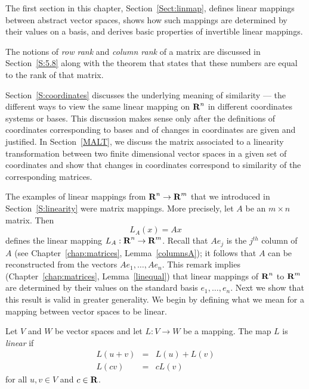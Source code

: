 \label{C:LMCC}

\normalsize

The first section in this chapter, Section~\ref{Sect:linmap}, defines linear 
mappings between abstract vector spaces, shows how such mappings are
determined by their values on a basis, and derives basic properties of 
invertible linear mappings. 
  
The notions of {\em row rank\/} and {\em column rank\/} of a matrix are
discussed in Section~\ref{S:5.8} along with the theorem that states that
these numbers are equal to the rank of that matrix.

Section~\ref{S:coordinates} discusses the underlying meaning of similarity 
--- the different ways to view the same linear mapping on $\mbox{$\bf{R}$}^n$ in different 
coordinates systems or bases.  This discussion makes sense only after the 
definitions of coordinates corresponding to bases and of changes in 
coordinates are given and justified.  In Section~\ref{MALT}, we discuss the 
matrix associated to a linearity transformation between two finite
dimensional vector spaces in a given set of coordinates and show that changes 
in coordinates correspond to similarity of the corresponding matrices.



  \label{Sect:linmap}

The examples of linear mappings
 from $\mbox{$\bf{R}$}^n\to\mbox{$\bf{R}$}^m$ that we introduced in
Section~\ref{S:linearity} were matrix mappings.  More precisely,
let $A$ be an $m\times n$ matrix.  Then
\[
L_A(x)=Ax
\]
defines the linear mapping $L_A:\mbox{$\bf{R}$}^n\to\mbox{$\bf{R}$}^m$.  Recall that $Ae_j$
is the $j^{th}$ column of $A$ (see Chapter~\ref{chap:matrices},
Lemma~\ref{columnsA}); it follows that $A$ can be
reconstructed from the vectors $Ae_1,\ldots,Ae_n$.  This remark
implies (Chapter~\ref{chap:matrices}, Lemma~\ref{linequal}) that
linear mappings of $\mbox{$\bf{R}$}^n$ to $\mbox{$\bf{R}$}^m$ are determined by their
values on the standard basis $e_1, \ldots, e_n$.  Next we show
that this result is valid in greater generality.  We begin by
defining what we mean for a mapping between vector spaces to be
linear.

\begin{Def}  \label{D:linearV}
Let $V$ and $W$ be vector spaces and let $L:V\to W$ be a mapping.  The map
$L$ is {\em linear\/} if
\begin{eqnarray*}
L(u+v) & = & L(u) + L(v) \\
L(cv) & = & cL(v)
\end{eqnarray*}
for all $u,v\in V$ and $c\in\mbox{$\bf{R}$}$.
\end{Def} 

